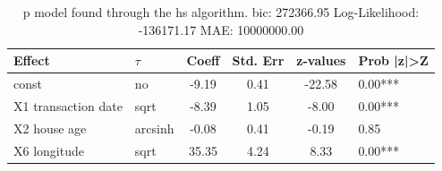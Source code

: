 \begin{table}
	\caption{p model found through the hs algorithm. bic: 272366.95 Log-Likelihood: -136171.17 MAE: 10000000.00}
	\begin{center}
		\begin{tabular}{|l|l|c|c|c|l|}
			\hline
			Effect & $\tau$ & Coeff & Std. Err & z-values & Prob |z|>Z \\
			\hline
			const & no & -9.19 & 0.41 & -22.58 & 0.00*** \\
			\hline
			X1 transaction date & sqrt & -8.39 & 1.05 & -8.00 & 0.00*** \\
			\hline
			X2 house age & arcsinh & -0.08 & 0.41 & -0.19 & 0.85 \\
			\hline
			X6 longitude & sqrt & 35.35 & 4.24 & 8.33 & 0.00*** \\
			\hline
		\end{tabular}
	\end{center}
\end{table}
